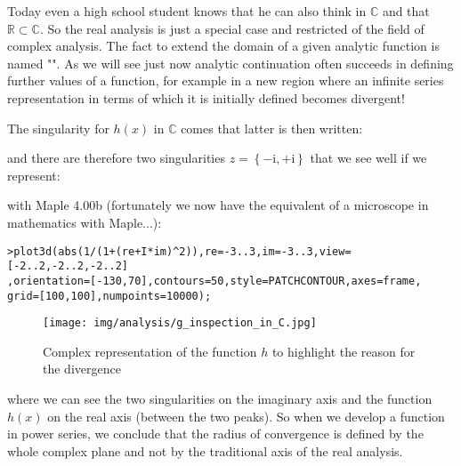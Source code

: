 	Today even a high school student knows that he can also think in $\mathbb{C}$ and that $\mathbb{R} \subset \mathbb{C}$. So the real analysis is just a special case and restricted of the field of complex analysis. The fact to extend the domain of a given analytic function is named "". As we will see just now analytic continuation often succeeds in defining further values of a function, for example in a new region where an infinite series representation in terms of which it is initially defined becomes divergent!
	
	The singularity for $h (x)$ in $\mathbb{C}$ comes that latter is then  written:
	
	and there are therefore two singularities $z=\left\lbrace{-\mathrm{i},+\mathrm{i} }\right\rbrace$ that we see well if we represent:
	
	with Maple 4.00b (fortunately we now have the equivalent of a microscope in mathematics with Maple...):
	
	\texttt{>plot3d(abs(1/(1+(re+I*im)\string^2)),re=-3..3,im=-3..3,view=[-2..2,-2..2,-2..2]\\
	,orientation=[-130,70],contours=50,style=PATCHCONTOUR,axes=frame,\\
	grid=[100,100],numpoints=10000);}
	
	\begin{figure}[H]
		\begin{center}
			\texttt{[image: img/analysis/g\_inspection\_in\_C.jpg]}
		\end{center}	
		\caption{Complex representation of the function $h$ to highlight the reason for the divergence}
	\end{figure}
	where we can see the two singularities on the imaginary axis and the function $h (x)$ on the real axis (between the two peaks). So when we develop a function in power series, we conclude that the radius of convergence is defined by the whole complex plane and not by the traditional axis of the real analysis.
	
